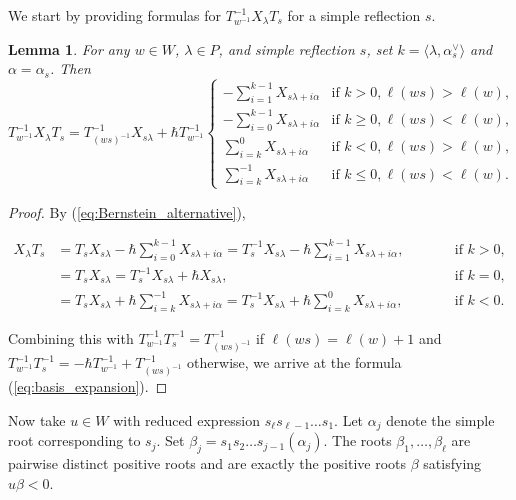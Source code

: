 \documentclass{amsart}
\newtheorem{Lem}[Thm]{Lemma}
\theoremstyle{definition}
\numberwithin{equation}{section}
\begin{document}
We start by providing formulas for $T_{w^{-1}}^{-1} X_\lambda T_s$ for a simple reflection $s$.
\begin{Lem}\label{Lem:simplecases} For any $w \in W$, $\lambda \in P$, and simple reflection $s$, set $k=\langle \lambda,\alpha_s^\vee\rangle$ and $\alpha=\alpha_s$. Then
    \begin{equation}\label{eq:basis_expansion}
T_{w^{-1}}^{-1}X_\lambda T_s=T_{(ws)^{-1}}^{-1}X_{s\lambda}+\hbar T_{w^{-1}}^{-1}\begin{cases} -\sum_{i=1}^{k-1}X_{s\lambda+i\alpha}& \text{if }k>0, \ell(ws)>\ell(w),\\
-\sum_{i=0}^{k-1}X_{s\lambda+i\alpha}& \text{if }k\geqslant 0, \ell(ws)<\ell(w),\\
\sum_{i=k}^0 X_{s\lambda+i\alpha}&\text{if }k< 0, \ell(ws)>\ell(w),\\
\sum_{i=k}^{-1} X_{s\lambda+i\alpha}&\text{if }k\leqslant 0, \ell(ws)<\ell(w).
\end{cases}
\end{equation}
\end{Lem}
\begin{proof}
By (\ref{eq:Bernstein_alternative}),

\begin{equation}\label{eq:Bernstein_new}
\begin{alignedat}{2}
X_\lambda T_s
&=T_sX_{s\lambda}
-\hbar\sum_{i=0}^{k-1}X_{s\lambda+i\alpha}
=T_s^{-1}X_{s\lambda}-\hbar\sum_{i=1}^{k-1} X_{s\lambda+i\alpha},
&\qquad& \text{if } k>0,\\
&=T_sX_{s\lambda}=T_s^{-1} X_{s\lambda}+\hbar X_{s\lambda},
&& \text{if } k=0,\\
&=T_sX_{s\lambda}+\hbar\sum_{i=k}^{-1}X_{s\lambda+i\alpha}
=T_s^{-1}X_{s\lambda}+\hbar\sum_{i=k}^{0}X_{s\lambda+i\alpha},
&& \text{if } k<0.
\end{alignedat}
\end{equation}

Combining this with $T_{w^{-1}}^{-1}T_s^{-1}=T_{(ws)^{-1}}^{-1}$ if $\ell(ws)=\ell(w)+1$ and $T_{w^{-1}}^{-1}T_s^{-1}=-\hbar T_{w^{-1}}^{-1}+T_{(ws)^{-1}}^{-1}$ otherwise, we arrive at the formula (\ref{eq:basis_expansion}).
\end{proof}

Now take $u\in W$ with reduced expression $s_\ell s_{\ell-1}\ldots s_1$. Let $\alpha_j$ denote the simple root corresponding to $s_j$. Set $\beta_j=s_1s_2\ldots s_{j-1}(\alpha_j)$. The roots $\beta_1,\ldots,\beta_\ell$ are pairwise distinct positive roots and are exactly the positive roots $\beta$ satisfying $u\beta<0$.
\end{document}
